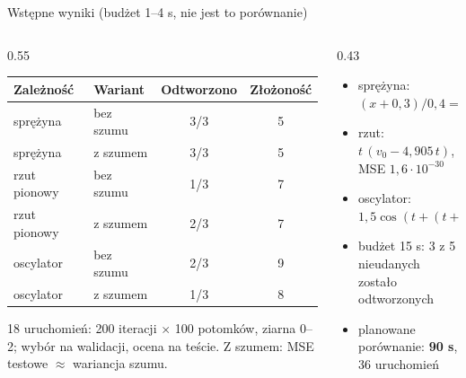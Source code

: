 \documentclass[aspectratio=169,11pt]{beamer}
\begin{document}
\begin{frame}{Wstępne wyniki (budżet 1--4 s, nie jest to porównanie)}
  \begin{columns}[c]
    \begin{column}{0.55\textwidth}
      \small
      \begin{tabular}{@{}llcc@{}}
        \toprule
        Zależność & Wariant & Odtworzono & Złożoność \\ \midrule
        sprężyna & bez szumu & 3/3 & 5 \\
        sprężyna & z szumem & 3/3 & 5 \\
        rzut pionowy & bez szumu & 1/3 & 7 \\
        rzut pionowy & z szumem & 2/3 & 7 \\
        oscylator & bez szumu & 2/3 & 9 \\
        oscylator & z szumem & 1/3 & 8 \\
        \bottomrule
      \end{tabular}\par\medskip
      {\footnotesize\color{muted}18 uruchomień: 200 iteracji $\times$ 100 potomków, ziarna 0--2; wybór na walidacji, ocena na teście.
      Z szumem: MSE testowe $\approx$ wariancja szumu.}
    \end{column}
    \begin{column}{0.43\textwidth}
      \begin{itemize}\small
        \item sprężyna: $(x + 0{,}3)/0{,}4 = 2{,}5x + 0{,}75$
        \item rzut: $t\,(v_0 - 4{,}905\,t)$, MSE $1{,}6\cdot10^{-30}$
        \item oscylator: $1{,}5\cos(t + (t + 0{,}3))$
        \item budżet 15 s: 3 z 5 nieudanych zostało odtworzonych
        \item planowane porównanie: \textbf{90 s}, 36 uruchomień
      \end{itemize}
    \end{column}
  \end{columns}
\end{frame}
\end{document}
